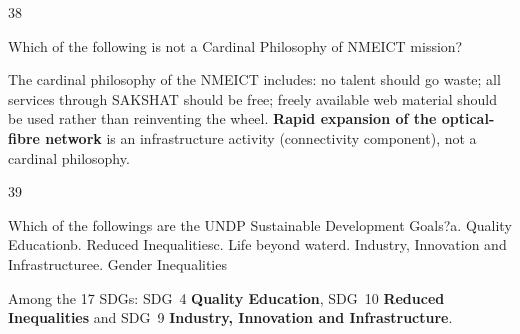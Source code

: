 \begin{question}{38}
{Which of the following is not a Cardinal Philosophy of NMEICT mission?\par}
\begin{explain}
The cardinal philosophy of the NMEICT includes: no talent should go waste; all services through SAKSHAT should be free; freely available web material should be used rather than reinventing the wheel. \textbf{Rapid expansion of the optical-fibre network} is an infrastructure activity (connectivity component), not a cardinal philosophy.
\end{explain}
\end{question}

\begin{question}{39}
{Which of the followings are the UNDP Sustainable Development Goals?\newline a. Quality Education\newline b. Reduced Inequalities\newline c. Life beyond water\newline d. Industry, Innovation and Infrastructure\newline e. Gender Inequalities\par}
\begin{explain}
Among the 17 SDGs: SDG~4 \textbf{Quality Education}, SDG~10 \textbf{Reduced Inequalities} and SDG~9 \textbf{Industry, Innovation and Infrastructure}.
\end{explain}
\end{question}

